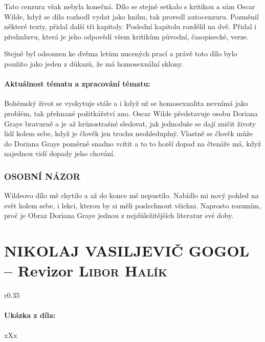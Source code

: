 \documentclass[A4paper]{extarticle} %
\begin{document}
\noindent
Tato cenzura však nebyla konečná.
Dílo se stejně setkalo s kritikou a sám Oscar Wilde, když se dílo rozhodl vydat jako knihu, tak provedl autocenzuru.
Pozměnil některé texty, přidal další tři kapitoly. Poslední kapitolu rozdělil na dvě. Přidal i předmluvu, která je jeho odpovědí všem kritikům původní, časopisecké, verze.

\noindent
Stejně byl odsouzen ke dvěma letům nucených prací a právě toto dílo bylo použito jako jeden z důkazů, že má homosexuální sklony.

\subsection*{Aktuálnost tématu a zpracování tématu:}
\noindent
Bohémský život se vyskytuje stále a i když už se homosexualita nevnímá jako problém, tak přehnané požitkářství ano.
Oscar Wilde představuje osobu Doriana Graye bravurně a je až hrůzostrašné sledovat, jak jednoduše se dají zničit životy lidí kolem sebe, když je člověk jen trochu neohleduplný.
Vlastně se člověk může do Doriana Graye poměrně snadno vcítit a to to horší dopad na čtenáře má, když najednou vidí dopady jeho chování.

\section*{OSOBNÍ NÁZOR}
\noindent 
Wildeovo dílo mě chytilo a až do konce mě nepustilo.
Nabídlo mi nový pohled na svět kolem sebe, i lekci, kterou by si měli poslechnout všichni.
Naprosto rozumím, proč je Obraz Doriana Graye jednou z nejdůležitějších literatur své doby.

\vfill


\newpage


\changefontsize{8pt}

\part*{NIKOLAJ VASILJEVIČ GOGOL -- Revizor {\hfill \normalfont\tiny\textsc{Libor Halík}}}

\noindent\begin{wrapfigure}{r}{0.35\textwidth}
\tiny

\subsection*{Ukázka z díla:}
\setlength{\parindent}{3pt}
xXx
\end{wrapfigure}
\end{document}
